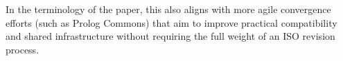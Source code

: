In the terminology of the paper, this also aligns with more agile convergence efforts (such as Prolog Commons) that aim to improve practical compatibility and shared infrastructure without requiring the full weight of an ISO revision process.

%
%
%
%
